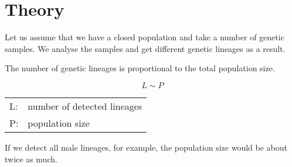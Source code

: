 \section{Theory}

Let us assume that we have a closed population and take a
number of genetic samples. We analyse the samples and get
different genetic lineages as a result.

The number of genetic lineages is proportional to the 
total population size.

\begin{equation}
L \sim P \label{lineages-population}
\end{equation}

\begin{tabular}{ll}
L:   & number of detected lineages\\
P:   & population size
\end{tabular}
\vspace{1em}

If we detect all male lineages, for example, the population
size would be about twice as much.


